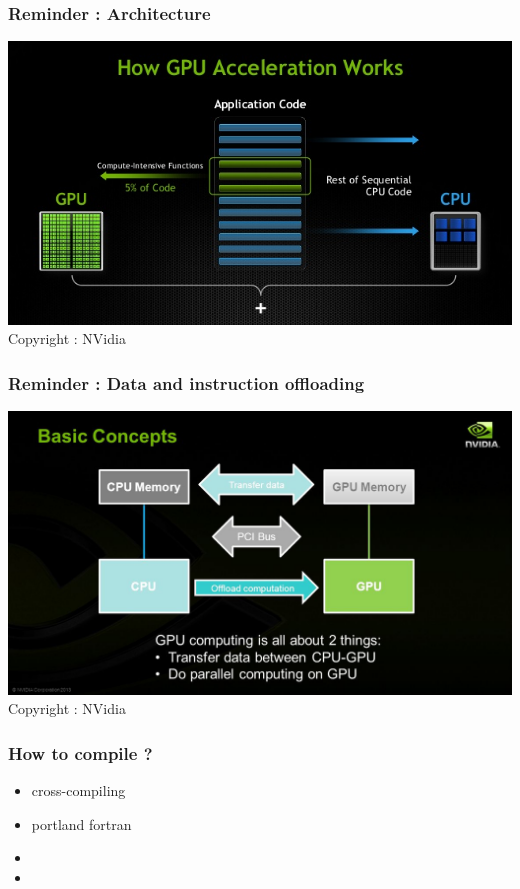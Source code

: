 \begin{frame}[containsverbatim]
	\frametitle{Reminder : Architecture}
	\begin{center}
	\includegraphics[width=\textwidth]{Day5/images/architecture.jpg}
	\\Copyright : NVidia
	\end{center}
\end{frame}

\begin{frame}[containsverbatim]
	\frametitle{Reminder : Data and instruction offloading}
	\begin{center}
	\includegraphics[width=\textwidth]{Day5/images/offloading.jpg}
	\\Copyright : NVidia
	\end{center}
\end{frame}

\begin{frame}[containsverbatim]
	\frametitle{How to compile ?}
	\begin{itemize}
	\item {cross-compiling}
	\item {portland fortran}
	\item {}
	\item {}
	\end{itemize}
\end{frame}


